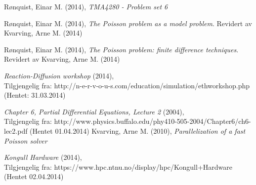 \begin{thebibliography}{9}

	Rønquist, Einar M. (2014),
	\emph{TMA4280 - Problem set 6}

	Rønquist, Einar M. (2014),
	\emph{The Poisson problem as a model problem}.
	Revidert av Kvarving, Arne M. (2014)

	Rønquist, Einar M. (2014),
	\emph{The Poisson problem: finite difference techniques}.
	Revidert av Kvarving, Arne M. (2014)

	\emph{Reaction-Diffusion workshop} (2014),\\
	Tilgjengelig fra: http://n-e-r-v-o-u-s.com/education/simulation/ethworkshop.php
	(Hentet: 31.03.2014)

	\emph{Chapter 6, Partial Differential Equations, Lecture 2} (2004),\\
	Tilgjengelig fra: http://www.physics.buffalo.edu/phy410-505-2004/Chapter6/ch6-lec2.pdf
	(Hentet 01.04.2014)
	Kvarving, Arne M. (2010),
	\emph{Parallelization of a fast Poisson solver}

	\emph{Kongull Hardware} (2014),\\
	Tilgjengelig fra: https://www.hpc.ntnu.no/display/hpc/Kongull+Hardware
	(Hentet 02.04.2014)
\end{thebibliography}
